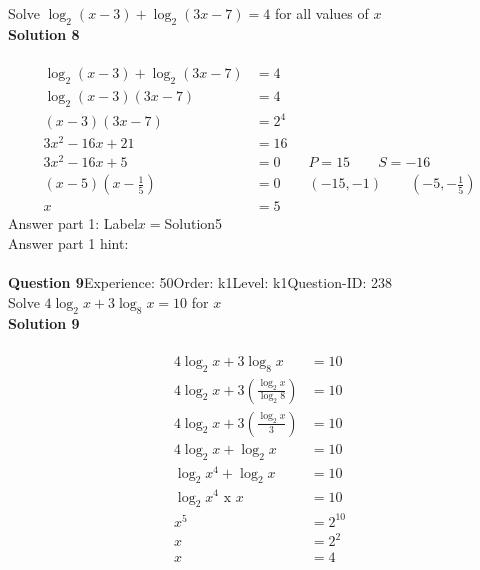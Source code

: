 \documentclass{article}
\begin{document}
Solve $\log_{2}(x-3)+\log_{2}(3x-7)=4$ for all values of $x$\\[4pt]
\noindent\textbf{Solution 8}\\[2pt]
\\[-35pt]\begin{align*}
\log_{2}(x-3)+\log_{2}(3x-7)&=4\\[2pt]
\log_{2}(x-3)(3x-7)&=4\\[2pt]
(x-3)(3x-7)&=2^4\\[2pt]
3x^2-16x+21&=16\\[2pt]
3x^2-16x+5&=0\qquad P=15 \qquad S=-16\\[2pt]
(x-5)\left(x-\displaystyle\frac{1}{5}\right)&=0\qquad (-15,-1) \qquad \left(-5,-\displaystyle\frac{1}{5}\right)\\[2pt]
x&=5
\end{align*}
Answer part 1: \hspace{10pt}Label\hspace{10pt}$x=$\hspace{10pt}Solution\hspace{10pt}5\\
Answer part 1 hint: \hspace{15pt}\\
\\[4pt]
\noindent\textbf{Question 9}\hspace{20pt}Experience: 50\hspace{20pt}Order: k1\hspace{20pt}Level: k1\hspace{20pt}Question-ID: 238\\[2pt]
Solve $4\log_{2}x+3\log_{8}x=10$ for $x$\\[4pt]
\noindent\textbf{Solution 9}\\[2pt]
\\[-35pt]\begin{align*}
4\log_{2}x+3\log_{8}x&=10\\[2pt]
4\log_{2}x+3\left(\displaystyle\frac{\log_{2}x}{\log_{2}8}\right)&=10\\[2pt]
4\log_{2}x+3\left(\displaystyle\frac{\log_{2}x}{3}\right)&=10\\[2pt]
4\log_{2}x+\log_{2}x&=10\\[2pt]
\log_{2}x^4+\log_{2}x&=10\\[2pt]
\log_{2}x^4\,\,\text{x}\,\,x&=10\\[2pt]
x^5&=2^{10}\\[2pt]
x&=2^2\\[2pt]
x&=4
\end{align*}
\end{document}
